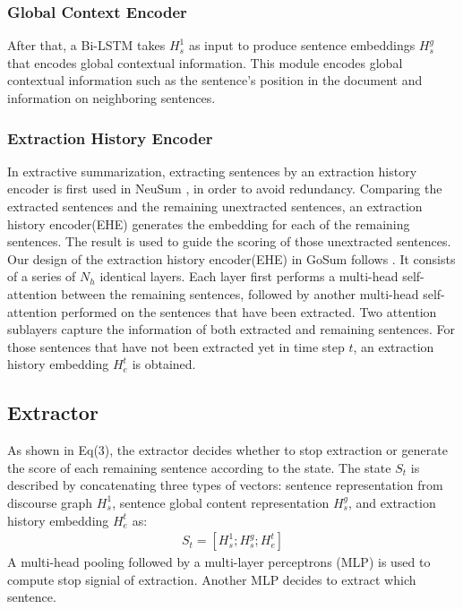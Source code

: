 \subsubsection{Global Context Encoder}
After that, a Bi-LSTM takes ${H}_s^1$ as input to produce sentence embeddings ${H}_s^g$ that encodes global contextual information. 
This module encodes global contextual information such as the sentence’s position in the document and information on neighboring sentences.

\subsubsection{Extraction History Encoder}
In extractive summarization, extracting sentences by an extraction history encoder is first used in NeuSum \cite{neusumm_history_2018}, in order to avoid redundancy.
Comparing the extracted sentences and the remaining unextracted sentences, an extraction history encoder(EHE) generates the embedding for each of the remaining sentences. The result is used to guide the scoring of those unextracted sentences.
Our design of the extraction history encoder(EHE) in GoSum follows \cite{memsum_2022}.
It consists of a series of $N_h$ identical layers.
Each layer first performs a multi-head self-attention between the remaining sentences, followed by another multi-head self-attention performed on the sentences that have been extracted.
Two attention sublayers capture the information of both extracted and remaining sentences.
For those sentences that have not been extracted yet in time step $t$, an extraction history embedding ${H}_e^t$ is obtained.

\subsection{Extractor}
As shown in Eq(3), the extractor decides whether to stop extraction or generate the score of each remaining sentence according to the state.
The state $S_t$ is described by concatenating three types of vectors:
sentence representation from discourse graph $H_s^1$,
sentence global content representation ${H}_s^g$,
and extraction history embedding ${H}_e^t$ as:
\begin{align}
    S_t = [H_s^1;H_s^g;H_e^t]
\end{align}
A multi-head pooling followed by a multi-layer perceptrons (MLP) is used to compute stop signial of extraction. Another MLP decides to extract which sentence.

